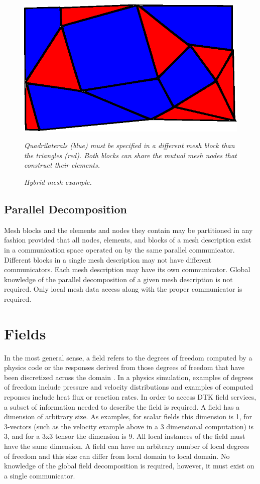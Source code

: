 \documentclass[letterpaper,12pt]{article}
\begin{document}
\begin{figure}[htpb!]
  \centering
  \includegraphics[width=5in]{hybrid_mesh.eps}
  \caption{\sl Hybrid mesh example.} {\sl Quadrilaterals (blue) must
    be specified in a different mesh block than the triangles
    (red). Both blocks can share the mutual mesh nodes that construct
    their elements.}
  \label{fig:hybrid_mesh}
\end{figure}

\subsection{Parallel Decomposition}\label{subsec:mesh_decomp}
Mesh blocks and the elements and nodes they contain may be partitioned
in any fashion provided that all nodes, elements, and blocks of a mesh
description exist in a communication space operated on by the same
parallel communicator. Different blocks in a single mesh description
may not have different communicators. Each mesh description may have
its own communicator. Global knowledge of the parallel decomposition
of a given mesh description is not required. Only local mesh data
access along with the proper communicator is required.

\clearpage

\section{Fields}\label{sec:field}
In the most general sense, a field refers to the degrees of freedom
computed by a physics code or the responses derived from those degrees
of freedom that have been discretized across the domain
\cite{LIME_2011}. In a physics simulation, examples of degrees of
freedom include pressure and velocity distributions and examples of
computed reponses include heat flux or reaction rates. In order to
access DTK field services, a subset of information needed to describe
the field is required. A field has a dimension of arbitrary size. As
examples, for scalar fields this dimension is 1, for 3-vectors (such
as the velocity example above in a 3 dimensional computation) is 3,
and for a 3x3 tensor the dimension is 9.  All local instances of the
field must have the same dimension. A field can have an arbitrary
number of local degrees of freedom and this size can differ from local
domain to local domain. No knowledge of the global field decomposition
is required, however, it must exist on a single communicator.
\end{document}
